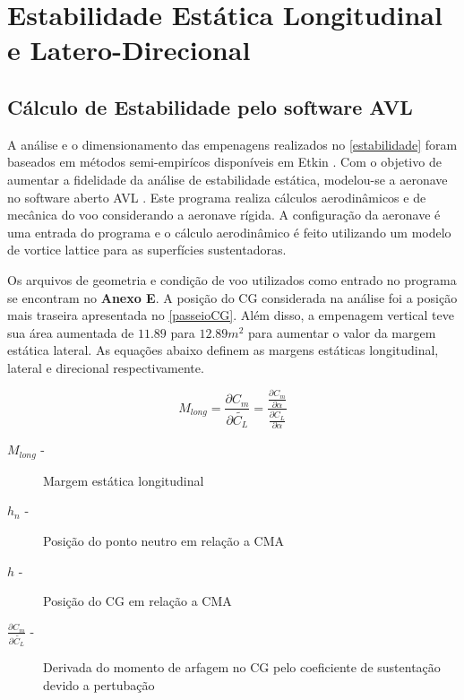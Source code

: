 \chapter{Estabilidade Estática Longitudinal e Latero-Direcional}

\section{Cálculo de Estabilidade pelo software AVL}

A análise e o dimensionamento das empenagens realizados no \autoref{estabilidade} foram baseados em métodos semi-empirícos disponíveis em Etkin \cite{etkin1996dynamics}. Com o objetivo de aumentar a fidelidade da análise de estabilidade estática, modelou-se a aeronave no software aberto AVL \cite{avl}. Este programa realiza cálculos aerodinâmicos e de mecânica do voo considerando a aeronave rígida. A configuração da aeronave é uma entrada do programa e o cálculo aerodinâmico é feito utilizando um modelo de vortice lattice para as superfícies sustentadoras.

Os arquivos de geometria e condição de voo utilizados como entrado no programa se encontram no \textbf{Anexo E}. A posição do CG considerada na análise foi a posição mais traseira apresentada no \autoref{passeioCG}. Além disso, a empenagem vertical teve sua área aumentada de $11.89$ para $12.89 m^2$ para aumentar o valor da margem estática lateral. As equações abaixo definem as margens estáticas longitudinal, lateral e direcional respectivamente.

\begin{equation}
  M_{long} = \frac{\partial C_m}{ \partial \widetilde{C_L}} = \frac{\frac{\partial C_m}{ \partial \alpha} }{\frac{\partial C_L}{ \partial \alpha} }
\end{equation}

\begin{description}
\item[$M_{long}$  -] Margem estática longitudinal
\item[$h_n$ -] Posição do ponto neutro em relação a CMA
\item[$h$ -] Posição do CG em relação a CMA
\item[$\frac{\partial C_m}{\partial \widetilde{C_L}}$ -] Derivada do momento de arfagem no CG pelo coeficiente de sustentação devido a pertubação
\end{description}

\vspace{1cm}

